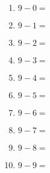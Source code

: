 \documentclass{article}
\begin{document}
\begin{multicols}{5}
\begin{enumerate}
\item $9 - 0 =$
\item $9 - 1 =$
\item $9 - 2 =$
\item $9 - 3 =$
\item $9 - 4 =$
\item $9 - 5 =$
\item $9 - 6 =$
\item $9 - 7 =$
\item $9 - 8 =$
\item $9 - 9 =$

\end{enumerate}
\end{multicols}
\end{document}
